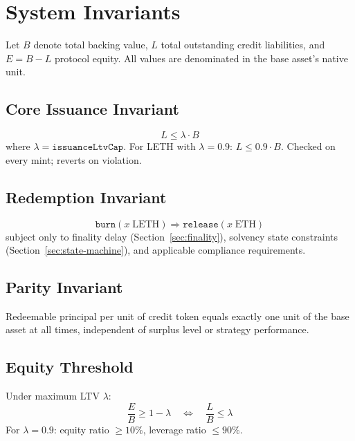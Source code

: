 \section{System Invariants}

\label{sec:invariants}

Let $B$ denote total backing value, $L$ total outstanding credit liabilities, and $E = B - L$ protocol equity. All values are denominated in the base asset's native unit.

\subsection{Core Issuance Invariant}

\begin{invariant}
\label{inv:issuance}
\begin{equation}
  L \leq \lambda \cdot B
\end{equation}
where $\lambda = \texttt{issuanceLtvCap}$. For LETH with $\lambda = 0.9$: $L \leq 0.9 \cdot B$. Checked on every mint; reverts on violation.
\end{invariant}

\subsection{Redemption Invariant}

\begin{invariant}
\label{inv:redemption}
\begin{equation}
  \texttt{burn}(x\;\text{LETH}) \Rightarrow \texttt{release}(x\;\text{ETH})
\end{equation}
subject only to finality delay (Section~\ref{sec:finality}), solvency state constraints (Section~\ref{sec:state-machine}), and applicable compliance requirements.
\end{invariant}

\subsection{Parity Invariant}

\begin{invariant}
\label{inv:parity}
Redeemable principal per unit of credit token equals exactly one unit of the base asset at all times, independent of surplus level or strategy performance.
\end{invariant}

\subsection{Equity Threshold}

\begin{invariant}
\label{inv:equity}
Under maximum LTV $\lambda$:
\begin{equation}
  \frac{E}{B} \geq 1 - \lambda \quad\Leftrightarrow\quad \frac{L}{B} \leq \lambda
\end{equation}
For $\lambda = 0.9$: equity ratio $\geq 10\%$, leverage ratio $\leq 90\%$.
\end{invariant}


